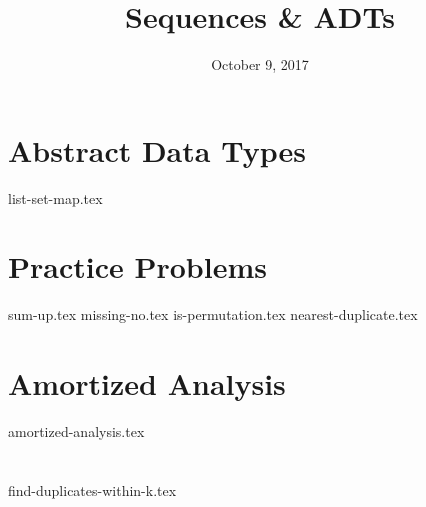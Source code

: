 \documentclass[11pt]{exam}
\title{Sequences \& ADTs}
\date{October 9, 2017}
\begin{document}
\maketitle

\section{Abstract Data Types}
{list-set-map.tex}

\clearpage

\section{Practice Problems}
\begin{questions}
{sum-up.tex}
{missing-no.tex}
\clearpage
{is-permutation.tex}
{nearest-duplicate.tex}
\end{questions}

\clearpage

\section{Amortized Analysis}
\begin{questions}
{amortized-analysis.tex}
\end{questions}

\section{}
\begin{questions}
{find-duplicates-within-k.tex}
\end{questions}
\end{document}
